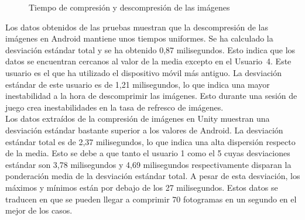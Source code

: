\begin{figure}[h]
     \hfill
	\caption{Tiempo de compresi\'on y descompresi\'on de las im\'agenes}
     \label{}
   \end{figure}



Los datos obtenidos de las pruebas muestran que la descompresi\'on de las im\'agenes en Android mantiene unos tiempos uniformes. Se ha calculado la desviaci\'on est\'andar total y se ha obtenido 0,87 milisegundos. Esto indica que los datos se encuentran cercanos al valor de la media excepto en el Usuario~4. Este usuario es el que ha utilizado el dispositivo m\'ovil m\'as antiguo. La desviaci\'on est\'andar de este usuario es de 1,21 milisegundos, lo que indica una mayor inestabilidad a la hora de descomprimir las im\'agenes. Esto durante una sesi\'on de juego crea inestabilidades en la tasa de refresco de im\'agenes. \\

Los datos extra\'idos de la compresi\'on de im\'agenes en Unity muestran una desviaci\'on est\'andar bastante superior a los valores de Android. La desviaci\'on est\'andar total es de 2,37 milisegundos, lo que indica una alta dispersi\'on respecto de la media. Esto se debe a que tanto el usuario 1 como el 5 cuyas desviaciones est\'andar son 3,78 milisegundos y 4,69 milisegundos respectivamente disparan la ponderaci\'on media de la desviaci\'on est\'andar total. A pesar de esta desviaci\'on, los m\'aximos y m\'inimos est\'an por debajo de los 27 milisegundos.  Estos datos se traducen en que se pueden llegar a comprimir 70 fotogramas en un segundo en el mejor de los casos.\\



